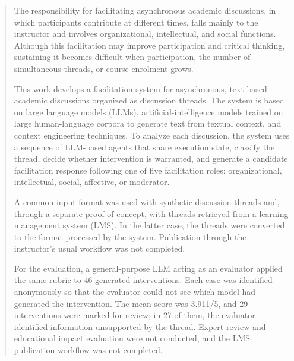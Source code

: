 \documentclass[tfm,estilo=digital,portada=normativa,estilobib=ieee]{fdi-simplex}
\begin{document}
\makeportada

\frontmatter

\begin{abstract}
The responsibility for facilitating asynchronous academic
discussions, in which participants contribute at different times,
falls mainly to the instructor and involves organizational,
intellectual, and social functions. Although this facilitation may
improve participation and critical thinking, sustaining it becomes
difficult when participation, the number of simultaneous threads, or
course enrolment grows.

This work develops a facilitation system for asynchronous, text-based
academic discussions organized as discussion threads. The system is
based on large language models (LLMs), artificial-intelligence models trained on large human-language
corpora to generate text from textual context, and context engineering
techniques. To analyze each
discussion, the system uses a sequence of LLM-based agents that share execution
state, classify the thread, decide whether intervention is warranted,
and generate a candidate facilitation response following one of five
facilitation roles: organizational, intellectual, social, affective,
or moderator.

A common input format was used with synthetic discussion threads and,
through a separate proof of concept, with threads retrieved from a
learning management system (LMS). In the latter case, the threads were
converted to the format processed by the system. Publication through
the instructor's usual workflow was not completed.

For the evaluation, a general-purpose LLM acting as an evaluator
applied the same rubric to 46 generated interventions. Each case was
identified anonymously so that the evaluator could not see which
model had generated the intervention. The mean score was 3.911/5, and
29 interventions were marked for review; in 27 of them, the evaluator
identified information unsupported by the thread. Expert review and
educational impact evaluation were not conducted, and the LMS
publication workflow was not completed.
\end{abstract}
\end{document}
